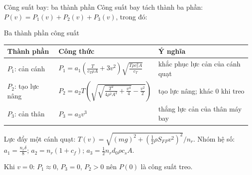 \documentclass[t,aspectratio=169]{beamer}
\begin{document}
\begin{frame}{Công suất bay: ba thành phần}
  \small Công suất bay tách thành ba phần: $P(v)=P_1(v)+P_2(v)+P_3(v)$, trong đó:
  \vspace{2pt}
  \begin{block}{Ba thành phần công suất}\scriptsize
  \setlength{\tabcolsep}{3pt}
  \renewcommand{\arraystretch}{1.0}
  \begin{tabular}{@{}>{\raggedright\arraybackslash}p{2.35cm} >{\raggedright\arraybackslash}p{7.35cm} >{\raggedright\arraybackslash}p{3.25cm}@{}}
    \toprule
    \textbf{Thành phần} & \textbf{Công thức} & \textbf{Ý nghĩa}\\
    \midrule
    $P_1$: cản cánh & $P_1=a_1\left(\frac{T}{c_T\rho A}+3v^2\right)\sqrt{\frac{T\rho c_s^2A}{c_T}}$ & khắc phục lực cản của cánh quạt\\
    $P_2$: tạo lực nâng & $P_2=a_2T\left(\sqrt{\sqrt{\frac{T^2}{4\rho^2A^2}+\frac{v^4}{4}}-\frac{v^2}{2}}\right)$ & tạo lực nâng; khác 0 khi treo\\
    $P_3$: cản thân & $P_3=a_3v^3$ & thắng lực cản của thân máy bay\\
    \bottomrule
  \end{tabular}
  \end{block}
  \vspace{2pt}
  {\scriptsize
  Lực đẩy một cánh quạt: $T(v)=\sqrt{(mg)^2+\left(\frac12\rho S_{FP}v^2\right)^2}\big/n_r$.\quad
  Nhóm hệ số: $a_1=\frac{n_r\delta}{8}$; $a_2=n_r(1+c_f)$; $a_3=\frac12 n_r d_0\rho c_sA$.\par
  Khi $v=0$: $P_1\approx0$, $P_3=0$, $P_2>0$ nên $P(0)$ là công suất treo.}
\end{frame}
\end{document}

